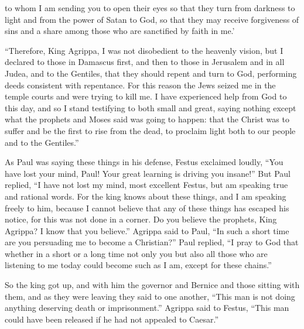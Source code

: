 {to
whom
I
am sending
you
to open
their
eyes
so that they turn
from
darkness
to
light
and
from the power
of Satan
to
God,
so that they
may receive
forgiveness
of sins
and
a share
among
those who are sanctified
by faith
in
me.’
\par }{\PP {}“Therefore,
King
Agrippa,
I was
not
disobedient
to the heavenly
vision,
but
I declared
to those in
Damascus
first,
and
then to those in Jerusalem
and in all
Judea,
and
to the Gentiles,
that they should repent
and
turn
to
God,
performing
deeds
consistent
with repentance.
For
this
reason
the Jews
seized
me
in
the temple courts
and were trying
to kill me.
I have experienced
help
from
God
to this
day,
and so I stand
testifying
to both
small
and
great,
saying
nothing
except
what
the prophets
and
Moses
said
was going
to happen:
that the Christ
was to suffer
and be the first
to rise
from
the dead,
to proclaim
light
both
to our people
and
to the Gentiles.”
\par }{\PP {}As Paul was saying these things
in his
defense,
Festus
exclaimed
loudly,
“You have lost
your mind, Paul! Your
great
learning
is driving
you insane!”
But
Paul
replied, “I have
not
lost
my mind,
most excellent
Festus,
but
am speaking
true
and
rational
words.
For
the king
knows
about
these things,
and I am speaking
freely
to
him,
because
I
cannot
believe
that any of these things has escaped his notice, for
this was
not
done
in
a corner.
Do you believe
the prophets,
King
Agrippa? I know
that
you believe.”
Agrippa
said to
Paul,
“In
such a short time
are you persuading
me
to become
a Christian?”
Paul
replied, “I pray
to God
that whether
in
a short
or
a long time
not
only
you
but
also
all
those who are listening
to me
today
could become
such
as
I
am,
except
for these
chains.”
\par }{\PP {}So
the king
got up,
and
with him the governor
and
Bernice
and
those sitting
with them,
and
as they were leaving
they said
to
one another, “This
man
is not
doing
anything
deserving
death
or
imprisonment.”
Agrippa
said
to Festus, “This
man
could
have been released
if
he had
not
appealed
to Caesar.”

}
